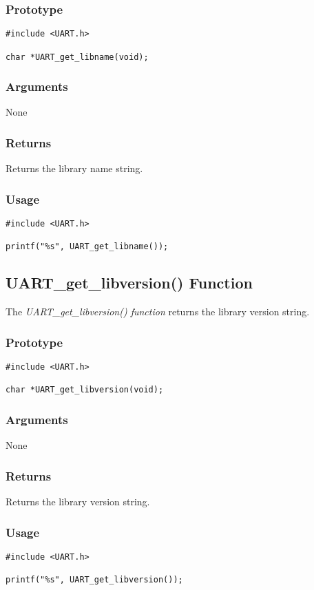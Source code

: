 \documentclass{report}
\begin{document}
\subsubsection*{Prototype}
\begin{lstlisting}
#include <UART.h>

char *UART_get_libname(void);
\end{lstlisting}
\subsubsection*{Arguments}
None
\subsubsection*{Returns}
Returns the library name string.
\subsubsection*{Usage}
\begin{lstlisting}
#include <UART.h>

printf("%s", UART_get_libname());
\end{lstlisting}
\subsection{UART\_get\_libversion() Function}
The \textit{UART\_get\_libversion() function} returns the library
version string.
\subsubsection*{Prototype}
\begin{lstlisting}
#include <UART.h>

char *UART_get_libversion(void);
\end{lstlisting}
\subsubsection*{Arguments}
None
\subsubsection*{Returns}
Returns the library version string.
\subsubsection*{Usage}
\begin{lstlisting}
#include <UART.h>

printf("%s", UART_get_libversion());
\end{lstlisting}
\end{document}
